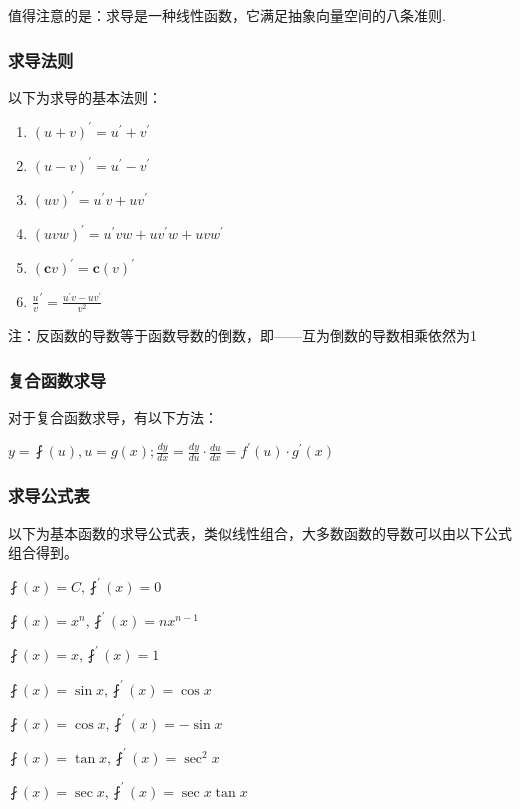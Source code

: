 \documentclass[UTF8]{ctexbook}
\newcommand{\derivative}{^\prime}
\begin{document}
{{{  值得注意的是：求导是一种线性函数，它满足抽象向量空间的八条准则.

  \subsubsection{求导法则}{
    以下为求导的基本法则：
    \begin{enumerate}
      \item $(u + v)\derivative = u\derivative + v\derivative$
      \item $(u - v)\derivative = u\derivative - v\derivative$
      \item $(uv)\derivative = u\derivative v + uv\derivative$
      \item $(uvw)\derivative = u\derivative vw + uv\derivative w + uvw\derivative$
      \item $(\mathbf{c}v)\derivative = \mathbf{c}(v)\derivative$
      \item $\frac{u}{v}\derivative = \frac{u\derivative v - uv\derivative}{v^2}$
    \end{enumerate}
    注：反函数的导数等于函数导数的倒数，即——互为倒数的导数相乘依然为1
  }%

  \subsubsection{复合函数求导}{
    对于复合函数求导，有以下方法：

    $y = \fint(u), u = g(x); \frac{dy}{dx} = \frac{dy}{du} \cdot \frac{du}{dx} = f\derivative(u) \cdot g\derivative(x)$
  }%

  \subsubsection{求导公式表}{
    以下为基本函数的求导公式表，类似线性组合，大多数函数的导数可以由以下公式组合得到。

    $\fint(x) = C, \fint\derivative(x) = 0$

    $\fint(x) = x^n, \fint\derivative(x) = nx^{n-1}$

    $\fint(x) = x, \fint\derivative(x) = 1$

    $\fint(x) = \sin x, \fint\derivative(x) = \cos x$

    $\fint(x) = \cos x, \fint\derivative(x) = -\sin x$

    $\fint(x) = \tan x, \fint\derivative(x) = \sec^2 x$

    $\fint(x) = \sec x, \fint\derivative(x) = \sec x\tan x$

}}}}
\end{document}
